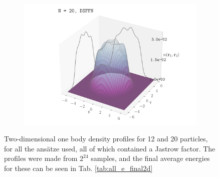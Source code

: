 \begin{figure}[H]
\begin{subfigure}[t]{0.32\textwidth}
    \end{subfigure}
    \begin{subfigure}[t]{0.32\textwidth}
        \centering
        \includegraphics[width=\textwidth]{Chapters/Results/dots/density_profile_3d_N20_nqs_dsffn_1.0.pdf}
    \end{subfigure}
    \caption{Two-dimensional one body density profiles for 12 and 20 particles, for all the ansätze used, all of which contained a Jastrow factor. The profiles were made from $2^{24}$ samples, and the final average energies for these can be seen in  Tab. \ref{tab:all_e_final2d}}
    \label{fig:3dobd}
\end{figure}



